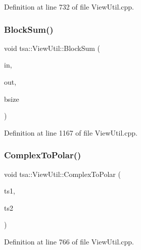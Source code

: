 Definition at line 732 of file View\+Util.\+cpp.

\mbox{\label{classtsa_1_1_view_util_acc21d93e9a9f6c6522adade5fd6e6f1f}} 
\subsubsection{\texorpdfstring{Block\+Sum()}{BlockSum()}}
{\footnotesize\ttfamily void tsa\+::\+View\+Util\+::\+Block\+Sum (\begin{DoxyParamCaption}\item[{\hyperlink{namespacetsa_ab32775c889b53c40fa83939f22372b75}{Seq\+View\+Complex} \&}]{in,  }\item[{\hyperlink{namespacetsa_ab32775c889b53c40fa83939f22372b75}{Seq\+View\+Complex} \&}]{out,  }\item[{int}]{bsize }\end{DoxyParamCaption})\hspace{0.3cm}{\ttfamily [static]}}



Definition at line 1167 of file View\+Util.\+cpp.

\mbox{\label{classtsa_1_1_view_util_a3ae34d28562d6ff11069e28442ddf4ab}} 
\subsubsection{\texorpdfstring{Complex\+To\+Polar()}{ComplexToPolar()}}
{\footnotesize\ttfamily void tsa\+::\+View\+Util\+::\+Complex\+To\+Polar (\begin{DoxyParamCaption}\item[{\hyperlink{namespacetsa_ab32775c889b53c40fa83939f22372b75}{Seq\+View\+Complex} \&}]{ts1,  }\item[{\hyperlink{namespacetsa_ac599574bcc094eda25613724b8f3ca9e}{Seq\+View\+Double} \&}]{ts2 }\end{DoxyParamCaption})\hspace{0.3cm}{\ttfamily [static]}}



Definition at line 766 of file View\+Util.\+cpp.

